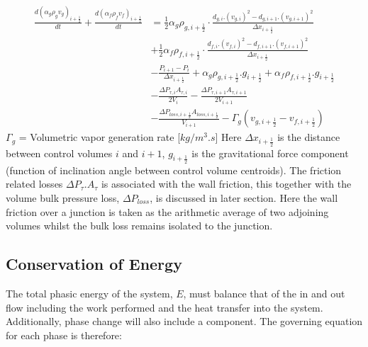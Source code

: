 \documentclass[11pt,letterpaper,titlepage]{article}
\newcommand{\half}{\frac{1}{2}}
\begin{document}
\begin{equation}
\begin{aligned}
\frac{d(\alpha_g\rho_g v_g)_{i+\half}}{dt}+\frac{d(\alpha_f\rho_f v_f)_{i+\half}}{dt}&=
\half \alpha_g \rho_{g,i+\half} \cdot\frac{d_{g,i}.(v_{g,i})^2-d_{g,i+1}.(v_{g,i+1})^2}{\Delta x_{i+\half}} \\
&+\half \alpha_f \rho_{f,i+\half} \cdot\frac{d_{f,i}.(v_{f,i})^2-d_{f,i+1}.(v_{f,i+1})^2}{\Delta x_{i+\half}} \\
&-\frac{P_{i+1}-P_i}{\Delta x_{i+\half}} + \alpha_g \rho_{g,i+\half}.g_{i+\half} + \alpha_f\rho_{f,i+\half}.g_{i+\half}\\
&-\frac{\Delta P_{\tau,i}A_{\tau,i}}{2V_i}-\frac{\Delta P_{\tau,i+1}A_{\tau,i+1}}{2V_{i+1}} \\
&-\frac{\Delta P_{loss,i+\half}A_{loss,i+\half}}{V_{i+1}} - \Gamma_g (v_{g,i+\half} - v_{f,i+\half})
\end{aligned}
\end{equation}
\newline \noindent $\Gamma_g$ \quad = Volumetric vapor generation rate [$kg/m^3.s$]
\newline
\newline
Here $\Delta x_{i+\half}$ is the distance between control volumes $i$ and $i+1$, $g_{i+\half}$ is the gravitational force component (function of inclination angle between control volume centroids). The friction related losses $\Delta P_{\tau}.A_{\tau}$ is associated with the wall friction, this together with the volume bulk pressure loss, $\Delta P_{loss}$, is discussed in later section. Here the wall friction over a junction is taken as the arithmetic average of two adjoining volumes whilst the bulk loss remains isolated to the junction.



























\newpage
\subsection{Conservation of Energy}
The total phasic energy of the system, $E$, must balance that of the in and out flow including the work performed and the heat transfer into the system. Additionally, phase change will also include a component. The governing equation for each phase is therefore:
\end{document}
